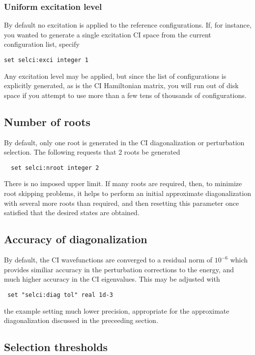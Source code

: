 \subsubsection{Uniform excitation level}

By default no excitation is applied to the reference configurations.
If, for instance, you wanted to generate a single excitation CI space
from the current configuration list, specify
\begin{verbatim}
set selci:exci integer 1
\end{verbatim}
Any excitation level may be applied, but since the list of
configurations is explicitly generated, as is the CI Hamiltonian
matrix, you will run out of disk space if you attempt to use more than
a few tens of thousands of configurations.

\subsection{Number of roots}

By default, only one root is generated in the CI diagonalization or
perturbation selection.  The following requests that 2 roots be
generated
\begin{verbatim}
  set selci:nroot integer 2
\end{verbatim}
There is no imposed upper limit.  If many roots are required, then, to
minimize root skipping problems, it helps to perform an initial
approximate diagonalization with several more roots than required, and
then resetting this parameter once satisfied that the desired
states are obtained.

\subsection{Accuracy of diagonalization}

By default, the CI wavefunctions are converged to a residual norm of
$10^{-6}$ which provides similiar accuracy in the perturbation
corrections to the energy, and much higher accuracy in the CI
eigenvalues.  This may be adjusted with
\begin{verbatim}
 set "selci:diag tol" real 1d-3
\end{verbatim}
the example setting much lower precision, appropriate for the
approximate diagonalization discussed in the preceeding section.

\subsection{Selection thresholds}


